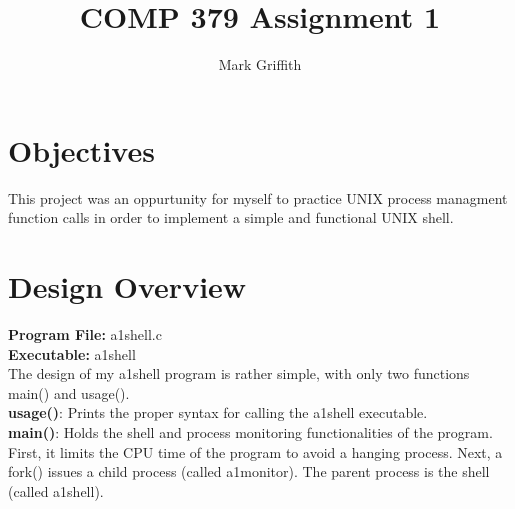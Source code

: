 \documentclass{article}
\begin{document}
\title{COMP 379 Assignment 1}
\author{Mark Griffith}

\maketitle

\section{Objectives}
This project was an oppurtunity for myself to practice UNIX process managment function calls
in order to implement a simple and functional UNIX shell.


\section{Design Overview}
\textbf{Program File:} a1shell.c \\
\textbf{Executable:} a1shell \\

\noindent
The design of my a1shell program is rather simple, with only two functions main() and usage(). \\

\noindent
\textbf{usage()}: Prints the proper syntax for calling the a1shell executable. \\

\noindent
\textbf{main()}: Holds the shell and process monitoring functionalities of the program.
First, it limits the CPU time of the program to avoid a hanging process.
Next, a fork() issues a child process (called a1monitor). The parent process is the shell (called a1shell). \\
\end{document}
